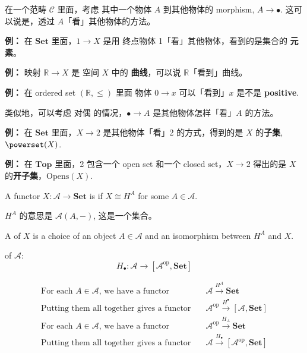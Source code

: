 在一个范畴 $\mathcal{C}$ 里面，考虑 其中一个物体 $A$ 到其他物体的 morphism, $A \rightarrow \bullet$.  这可以说是，透过 $A$「看」其他物体的方法。

\textbf{例：} 在 $\mathbf{Set}$ 里面，$1 \rightarrow X$ 是用 终点物体 1「看」其他物体，看到的是集合的 \textbf{元素}。

\textbf{例：} 映射 $\mathbb{R} \rightarrow X$ 是 空间 $X$ 中的 \textbf{曲线}，可以说 $\mathbb{R}$「看到」曲线。

\textbf{例：} 在 ordered set $(\mathbb{R}, \le)$ 里面 物体 $0 \rightarrow x$ 可以「看到」$x$ 是不是 \textbf{positive}.

类似地，可以考虑 对偶 的情况，$\bullet \rightarrow A$ 是其他物体怎样「看」$A$ 的方法。

\textbf{例：} 在 $\mathbf{Set}$ 里面，$X \rightarrow 2$ 是其他物体「看」2 的方式，得到的是 $X$ 的\textbf{子集}, $\powerset(X)$. 

\textbf{例：} 在 $\mathbf{Top}$ 里面，2 包含一个 open set 和一个 closed set，$X \rightarrow 2$ 得出的是 $X$ 的\textbf{开子集}，$\mathrm{Opens}(X)$.

A functor $X: \mathcal{A} \rightarrow \mathbf{Set}$ is  if $X \cong H^A$ for some $A \in \mathcal{A}$.

$H^A$ 的意思是 $\mathcal{A}(A, -)$, 这是一个集合。 

A  of $X$ is a choice of an object $A \in \mathcal{A}$ and an isomorphism between $H^A$ and $X$. 

 of $\mathcal{A}$:
\begin{equation}
H_{\bullet}: \mathcal{A} \rightarrow [\mathcal{A}^{\mathrm{op}} , \mathbf{Set}]
\end{equation}

\begin{align}
\mbox{For each } A \in \mathcal{A} \mbox{, we have a functor} \quad
& \mathcal{A} \stackrel{H^A}{\longrightarrow} \mathbf{Set} \nonumber \\
\mbox{Putting them all together gives a functor} \quad
& \mathcal{A}^{\mathrm{op}} \stackrel{H^{\bullet}}{\longrightarrow} [\mathcal{A} , \mathbf{Set}] \\[10pt]
\mbox{For each } A \in \mathcal{A} \mbox{, we have a functor} \quad
& \mathcal{A}^{\mathrm{op}} \stackrel{H_A}{\longrightarrow} \mathbf{Set} \nonumber \\
\mbox{Putting them all together gives a functor} \quad
& \mathcal{A} \stackrel{H_{\bullet}}{\longrightarrow} [\mathcal{A}^{\mathrm{op}} , \mathbf{Set}] \nonumber
\end{align}

